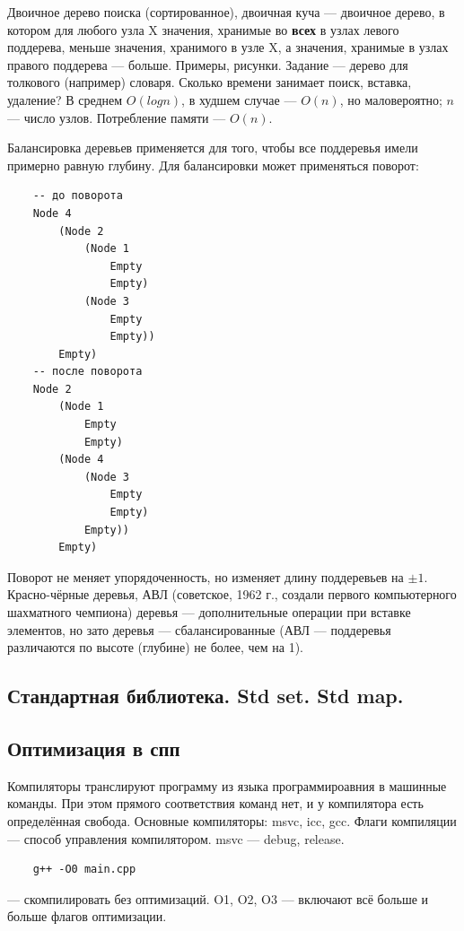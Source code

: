 \documentclass{book}
\begin{document}
Двоичное дерево поиска (сортированное), двоичная куча --- двоичное дерево, в котором для любого
узла X значения, хранимые во {\bf всех} в узлах левого поддерева, меньше значения, хранимого в узле
X, а значения, хранимые в узлах правого поддерева --- больше. Примеры, рисунки. Задание --- дерево
для толкового (например) словаря. Сколько времени занимает поиск, вставка, удаление? В среднем
$O(log n)$, в худшем случае --- $O(n)$, но маловероятно; $n$ --- число узлов. Потребление памяти
--- $O(n)$.

Балансировка деревьев применяется для того, чтобы все поддеревья имели примерно равную глубину. Для
балансировки может применяться поворот:
\begin{verbatim}
    -- до поворота
    Node 4
        (Node 2
            (Node 1
                Empty
                Empty)
            (Node 3
                Empty
                Empty))
        Empty)
    -- после поворота
    Node 2
        (Node 1
            Empty
            Empty)
        (Node 4
            (Node 3
                Empty
                Empty)
            Empty))
        Empty)
\end{verbatim}
Поворот не меняет упорядоченность, но изменяет длину поддеревьев на $\pm 1$. Красно-чёрные деревья,
АВЛ (советское, 1962 г., создали первого компьютерного шахматного чемпиона) деревья ---
дополнительные операции при вставке элементов, но зато деревья --- сбалансированные (АВЛ ---
поддеревья различаются по высоте (глубине) не более, чем на 1).

\subsection{Стандартная библиотека. Std set. Std map.}

\subsection{Оптимизация в спп}

Компиляторы транслируют программу из языка программироавния в машинные команды. При этом прямого
соответствия команд нет, и у компилятора есть определённая свобода. Основные компиляторы: msvc,
icc, gcc. Флаги компиляции --- способ управления компилятором. msvc --- debug, release.
\begin{verbatim}
    g++ -O0 main.cpp
\end{verbatim}
--- скомпилировать без оптимизаций. O1, O2, O3 --- включают всё больше и больше флагов оптимизации.
\end{document}
